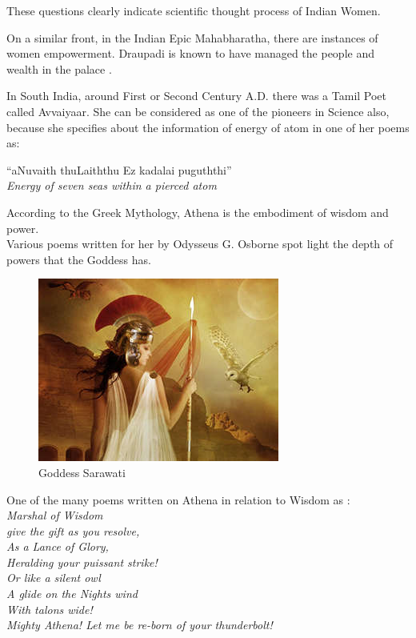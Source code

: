 \documentclass[a4paper,10pt]{article}
\begin{document}
These questions clearly indicate scientific thought process of Indian Women. 

On a similar front, in the Indian Epic Mahabharatha, there are instances of women empowerment. Draupadi is known to have managed the people and wealth in the palace \cite{mahabharatha}. 

In South India, around First or Second Century A.D. there was a Tamil Poet called Avvaiyaar. She can be considered as one of the pioneers in Science also, because she specifies about the information of energy of atom in one of her poems as: \\
\begin{center}
``aNuvaith thuLaiththu Ez kadalai puguththi'' \\
\textit{Energy of seven seas within a pierced atom}\\
\end{center}
\newblock
According to the Greek Mythology, Athena is the embodiment of wisdom and power.\\
Various poems written for her by Odysseus G. Osborne spot light the depth of powers that the Goddess has.\\
\begin{center}
\begin{figure}[h]
\centering
 \includegraphics[scale=0.7]{athena_7.jpg}
 \caption{Goddess Sarawati}
\end{figure}
\end{center}

One of the many poems written on Athena in relation to Wisdom as \cite{athena}:\\


\textit{Marshal of Wisdom}\\
\textit{give the gift as you resolve,}\\
\textit{As a Lance of Glory,}\\
\textit{Heralding your puissant strike!}\\
\textit{Or like a silent owl}\\
\textit{A glide on the Nights wind}\\
\textit{With talons wide!}\\
\textit{Mighty Athena! Let me be re-born of your thunderbolt!}\\
\end{document}

